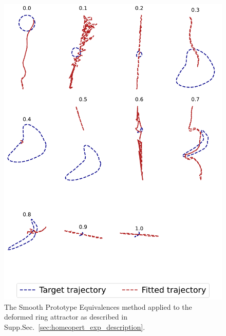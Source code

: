 \documentclass{article}
\theoremstyle{definition} \newtheorem{definition}{Definition}  \newtheorem{example}{Example}
\theoremstyle{remark} \newtheorem{remark}{Remark}
\newcounter{ct}
\begin{document}
\begin{figure}[htbp]
    \centering
    \includegraphics[width=\linewidth]{deformed_both_trajectories_asy_spe}
    \caption{The Smooth Prototype Equivalences method applied to the deformed ring attractor as described in Supp.Sec.~\ref{sec:homeopert_exp_description}.
     }
    \label{fig:deformed_both_trajectories_asy_spe}
\end{figure}




\FloatBarrier
\end{document}
